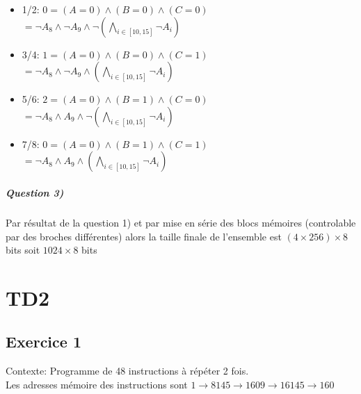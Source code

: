 \documentclass[12pt]{report}
\begin{document}
\begin{itemize}
\item 1/2: $0 =  (A = 0) \wedge (B = 0) \wedge (C=0) $
$= \neg A_8 \wedge \neg A_9 \wedge \neg (\bigwedge_{i \in [10,15]} \neg A_i)$ 
\item 3/4: $1 =  (A = 0) \wedge (B = 0) \wedge (C=1)$
$= \neg A_8 \wedge \neg A_9 \wedge  (\bigwedge_{i \in [10,15]} \neg A_i)$ 
\item 5/6: $2 =  (A = 0) \wedge (B = 1) \wedge (C=0)$
$= \neg A_8 \wedge  A_9 \wedge \neg (\bigwedge_{i \in [10,15]} \neg A_i)$ 
\item 7/8: $0 =  (A = 0) \wedge (B = 1) \wedge (C=1)$
$= \neg A_8 \wedge  A_9 \wedge  (\bigwedge_{i \in [10,15]} \neg A_i)$ 
\end{itemize} 

\paragraph*{Question 3)}
Par résultat de la question 1) et par mise en série des blocs mémoires (controlable par des broches différentes) alors la taille finale de l'ensemble est $(4 \times 256) \times 8$ bits  soit $1024 \times 8$ bits

\chapter{TD2}

\section{Exercice 1}

Contexte: Programme de 48 instructions à répéter 2 fois.\\

Les adresses mémoire des instructions sont $\boxed{1 \to 8}\boxed{145 \to 160}\boxed{9 \to 16}\boxed{145 \to 160}$
\end{document}
